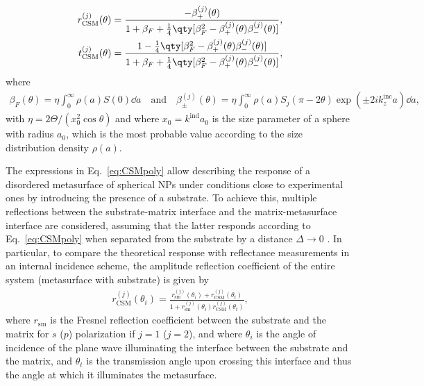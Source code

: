 %
\begin{subequations}%
	\begin{align}%
		r_\text{CSM}^{(j)}(\theta) &= \frac{-\beta_{+}^{(j)}(\theta)}
		{1+\beta_F + \frac{1}{4} \qty[\beta_F^2-\beta_{+}^{(j)}(\theta) \beta_{-}^{(j)}(\theta)]},%
		\\
		t_\text{CSM}^{(j)}(\theta) &= \frac{1 - \frac{1}{4}\qty[\beta_F^2- \beta_{+}^{(j)}(\theta)\beta_{-}^{(j)}(\theta)]}
		{1+\beta_F + \frac{1}{4} \qty[\beta_F^2-\beta_{+}^{(j)}(\theta) \beta_{-}^{(j)}(\theta)]},
	\end{align}%
	\label{eq:CSMpoly}%
\end{subequations}%
%
where
%
\begin{align}
	\beta_F(\theta) = \eta \int_{0}^{\infty} \rho(a)S(0)\dd{a}
	\quad\text{and}\quad
	\beta_{\pm}^{(j)}(\theta) = \eta \int_{0}^{\infty} \rho (a)S_{j}(\pi-2\theta)\exp(\pm2ik_z^\text{inc} a)\dd{a},
	\label{eq:betas}
\end{align}%
with $\eta = 2 \Theta/(x_0^2 \cos\theta)$ and where $x_0 = k^\text{ind}a_0$ is the size parameter of a sphere with radius $a_0$, which is the most probable value according to the size distribution density $\rho(a)$.

The expressions in Eq.~\eqref{eq:CSMpoly} allow describing the response of a disordered metasurface of spherical NPs under conditions close to experimental ones by introducing the presence of a substrate. To achieve this, multiple reflections between the substrate-matrix interface and the matrix-metasurface interface are considered, assuming that the latter responds according to Eq.~\eqref{eq:CSMpoly} when separated from the substrate by a distance $\Delta\to 0$ \cite{vazquez-estrada_optical_2014}. In particular, to compare the theoretical response with reflectance measurements in an internal incidence scheme, the amplitude reflection coefficient of the entire system (metasurface with substrate) is given by \cite{vazquez-estrada_optical_2014} 
%
\begin{align}
	r^{(j)}_\text{CSM}(\theta_i)=\frac{r^{(j)}_\text{sm}(\theta_i)+r^{(j)}_\text{CSM}(\theta_t)}{1+r_\text{sm}^{(j)}(\theta_i)r_\text{CSM}^{(j)}(\theta_t)},
\end{align}
%
where $r_\text{sm}$ is the Fresnel reflection coefficient between the substrate and the matrix for $s$ ($p$) polarization if $j=1$ ($j=2$), and where $\theta_i$ is the angle of incidence of the plane wave illuminating the interface between the substrate and the matrix, and $\theta_t$ is the transmission angle upon crossing this interface and thus the angle at which it illuminates the metasurface.



